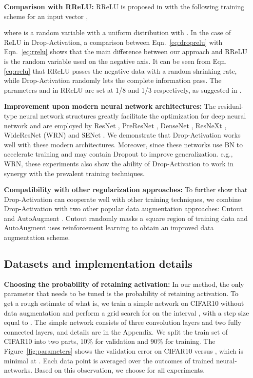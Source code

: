 \documentclass[11pt]{article}
\begin{document}
\label{subsec:design}
\textbf{Comparison with RReLU:} RReLU is proposed in \cite{rrelu} with the following training scheme for an input vector ,

where  is a random variable with a uniform distribution  with . In the case of ReLU in Drop-Activation, a comparison between Eqn.~\eqref{eq:droprelu} with Eqn.~\eqref{eq:rrelu} shows that the main difference between our approach and RReLU is the random variable used on the negative axis. It can be seen from Eqn. \eqref{eq:rrelu} that RReLU passes the negative data with a random shrinking rate, while Drop-Activation randomly lets the complete information pass. The parameters  and  in RReLU are set at 1/8 and 1/3 respectively, as suggested in \cite{rrelu}.

\textbf{Improvement upon modern neural network architectures:} The residual-type neural network structures greatly facilitate the optimization for deep neural network \cite{resnet} and are employed by ResNet \cite{resnet}, PreResNet \cite{preresnet}, DenseNet \cite{densenet}, ResNeXt \cite{resnext}, WideResNet (WRN)\cite{wrn} and SENet \cite{se}. We demonstrate that Drop-Activation works well with these modern architectures. Moreover, since these networks use BN to accelerate training and may contain Dropout to improve generalization. e.g., WRN, these experiments also show the ability of Drop-Activation to work in synergy with the prevalent training techniques.

\textbf{Compatibility with other regularization approaches:} To further show that Drop-Activation can cooperate well with other training techniques, we combine Drop-Activation with two other popular data augmentation approaches: Cutout \cite{cutout} and AutoAugment \cite{autoaugment}. Cutout randomly masks a square region of training data and AutoAugment uses reinforcement learning to obtain an improved data augmentation scheme.

\subsection{Datasets and implementation details}
\label{subsec:dataset}
\textbf{Choosing the probability of retaining activation:}
In our method, the only parameter that needs to be tuned is the probability  of retaining activation. To get a rough estimate of what  is, we train a simple network on CIFAR10 without data augmentation and perform a grid search for  on the interval , with a step size equal to . The simple network consists of three convolution layers and two fully connected layers, and details are in the Appendix. We split the train set of CIFAR10 into two parts, 10\% for validation and 90\% for training. The Figure~\ref{fig:parameters} shows the validation error on CIFAR10 versus , which is minimal at . Each data point is averaged over the outcomes of  trained neural-networks. Based on this observation, we choose  for all experiments.
\end{document}
